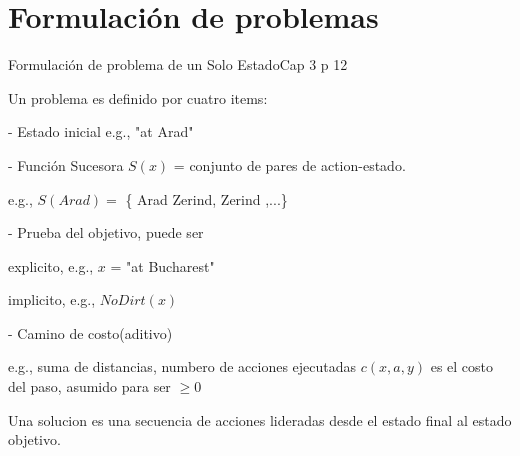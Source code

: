 \documentclass{beamer}
\theoremstyle{definition}
\theoremstyle{theorem}
\theoremstyle{remark}
\begin{document}
\section{Formulación de problemas}%


\begin{frame}{Formulación de problema de un Solo Estado}{Cap 3 p 12}
    \begin{right}
        
        Un problema es definido por cuatro items:
        
        - Estado inicial e.g., "at Arad"
        
        - Función Sucesora $S(x)$ = conjunto de pares de action-estado.
        
        e.g., $S(Arad)=$ \{  \left\langle Arad  \longrightarrow Zerind, Zerind \right\rangle,...\}
            
        - Prueba del objetivo, puede ser
        
        explicito, e.g., $x$ = "at Bucharest"
        
        implicito, e.g., $NoDirt(x)$
        
        - Camino de costo(aditivo)
        
        e.g., suma de distancias, numbero de acciones ejecutadas $c(x,a,y)$ es el costo del paso, asumido para ser $ \geq 0$
        
        Una solucion es una secuencia de acciones lideradas desde el estado final al estado objetivo.
        
    \end{right}
\end{frame}
\end{document}
